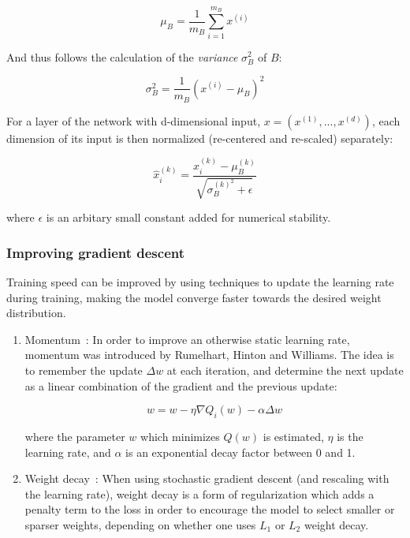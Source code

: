 \documentclass[oneside, english, bibtex]{kththesis}
\begin{document}
\begin{enumerate}
\begin{equation}
    \mu_B = \frac{1}{m_B} \sum_{i=1}^{m_B} x^{(i)}
    \label{eqn:bnmean}
\end{equation}

And thus follows the calculation of the \textit{variance} $\sigma_B^2$ of $B$:

\begin{equation}
    \sigma_B^2 = \frac{1}{m_B} (x^{(i)} - \mu_B)^2
    \label{eqn:bnvariance}
\end{equation}

For a layer of the network with d-dimensional input, $ x = (x^{(1)}, ..., x^{(d)}) $, each dimension of its input is then normalized (re-centered and re-scaled) separately:

\begin{equation}
    \hat{x}_{i}^{(k)} = \frac{x_{i}^{(k)} - \mu_{B}^{(k)}}{\sqrt{\sigma_{B}^{(k)^2} + \epsilon}}
    \label{eqn:bnorm}
\end{equation}

where $\epsilon$ is an arbitary small constant added for numerical stability.

\end{enumerate}
\subsubsection{Improving gradient descent}

Training speed can be improved by using techniques to update the learning rate during training, making the model converge faster towards the desired weight distribution.
\begin{enumerate}
\item Momentum~\cite{Rumelhart1986}: In order to improve an otherwise static learning rate, momentum was introduced by Rumelhart, Hinton and Williams. The idea is to remember the update $\Delta w$ at each iteration, and determine the next update as a linear combination of the gradient and the previous update:

\begin{equation}
    w = w - \eta \nabla Q_i(w)- \alpha \Delta w
    \label{eqn:momentum}
\end{equation}

where the parameter $w$ which minimizes $Q(w)$ is estimated, $\eta$ is the learning rate, and $\alpha$ is an exponential decay factor between 0 and 1.

\item Weight decay~\cite{DBLP:journals/corr/abs-1711-05101}: When using stochastic gradient descent (and rescaling with the learning rate), weight decay
is a form of regularization which adds a penalty term to the loss in order to encourage the model to select smaller or sparser weights,
depending on whether one uses $L_1$ or $L_2$ weight decay.

\end{enumerate}
\end{document}
